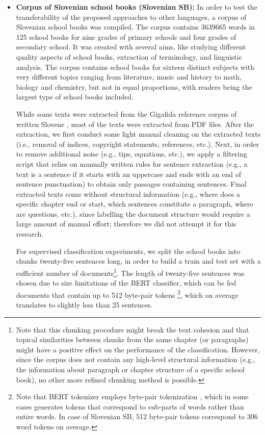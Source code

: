 \documentclass{clv3}
\begin{document}
\begin{itemize}
    \item { \bf Corpus of Slovenian school books (Slovenian SB):} In order to test the transferability of the proposed approaches to other languages, a corpus of Slovenian school books was compiled. The corpus contains \num{3639665} words in \num{125} school books for nine grades of primary schools and four grades of secondary school. It was created with several aims, like studying different quality aspects of school books, extraction of terminology, and linguistic analysis. The corpus contains school books for sixteen distinct subjects with very different topics ranging from literature, music and history to math, biology and chemistry, but not in equal proportions, with readers being the largest type of school books included.
    
    While some texts were extracted from the Gigafida reference corpus of written Slovene \citep{logar2012korpusi}, most of the texts were extracted from PDF files. After the extraction, we first conduct some light manual cleaning on the extracted texts (i.e., removal of indices, copyright statements, references, etc.). Next, in order to remove additional noise (e.g., tips, equations, etc.), we apply a filtering script that relies on manually written rules for sentence extraction (e.g., a text is a sentence if it starts with an uppercase and ends with an end of sentence punctuation) to obtain only passages containing sentences. Final extracted texts come without structural information (e.g., where does a specific chapter end or start, which sentences constitute a paragraph, where are questions, etc.), since labelling the document structure would require a large amount of manual effort; therefore we did not attempt it for this research. 
    
    For supervised classification experiments, we split the school books into chunks twenty-five sentences long, in order to build a train and test set with a sufficient number of documents\footnote{Note that this chunking procedure might break the text cohesion and that topical similarities between chunks from the same chapter (or paragraphs) might have a positive effect on the performance of the classification. However, since the corpus does not contain any high-level structural information (e.g., the information about paragraph or chapter structure of a specific school book), no other more refined chunking method is possible.}. The length of twenty-five sentences was chosen due to size limitations of the BERT classifier, which can be fed documents that contain up to 512 byte-pair tokens \citep{kudo2018sentencepiece}\footnote{Note that BERT tokenizer employs byte-pair tokenization \citep{kudo2018sentencepiece}, which in some cases generates tokens that correspond to sub-parts of words rather than entire words. In case of Slovenian SB, 512 byte-pair tokens correspond to 306 word tokens on average.}, which on average translates to slightly less than 25 sentences.
    
 \end{itemize}
 
\end{document}
